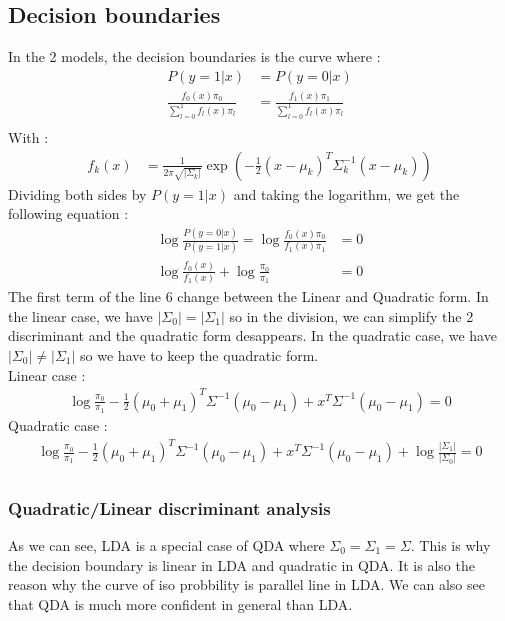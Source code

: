 \documentclass[12pt]{article}
\begin{document}
\subsection{Decision boundaries}
In the 2 models, the decision boundaries is the curve where :
\begin{align}	
P(y=1|x) &= P(y=0|x)\\
\frac{f_0(x)\pi_0}{\sum^1_{l=0}f_l(x)\pi_l}&=\frac{f_1(x)\pi_1}{\sum^1_{l=0}f_l(x)\pi_l}\\
\end{align}
With : 
\begin{align}
	f_k(x) &= \frac{1}{2\pi\sqrt{|\Sigma_k|}}\exp\left(-\frac{1}{2}(x-\mu_k)^T\Sigma_k^{-1}(x-\mu_k)\right)
\end{align}
Dividing both sides by $P(y=1|x)$ and taking the logarithm, we get the following equation :
\begin{align}
	\log\frac{P(y=0|x)}{P(y=1|x)} = \log\frac{f_0(x)\pi_0}{f_1(x)\pi_1 }&=0\\
	\log\frac{f_0(x)}{f_1(x)} + \log\frac{\pi_0}{\pi_1}&= 0
\end{align}
The first term of the line 6 change between the Linear and Quadratic form. In the linear case, we have $|\Sigma_0|=|\Sigma_1|$ so in the division, we can simplify the 2 discriminant
and the quadratic form desappears. In the quadratic case, we have $|\Sigma_0|\neq|\Sigma_1|$ so we have to keep the quadratic form.\\
Linear case : 
\begin{align}
	\log\frac{\pi_0}{\pi_1} - \frac{1}{2}(\mu_0+\mu_1)^T\Sigma^{-1}(\mu_0-\mu_1) + x^T\Sigma^{-1}(\mu_0-\mu_1) = 0
\end{align}
Quadratic case : 
\begin{align}
	\log\frac{\pi_0}{\pi_1} - \frac{1}{2}(\mu_0+\mu_1)^T\Sigma^{-1}(\mu_0-\mu_1) + x^T\Sigma^{-1}(\mu_0-\mu_1) + \log\frac{|\Sigma_1|}{|\Sigma_0|} = 0
\end{align}
\subsection{}
\subsubsection[]{Quadratic/Linear discriminant analysis}
As we can see, LDA is a special case of QDA where $\Sigma_0=\Sigma_1=\Sigma$. This is why the decision boundary is linear in LDA and quadratic in QDA.
It is also the reason why the curve of iso probbility is parallel line in LDA. We can also see that QDA is much more confident in general than LDA.
\end{document}
